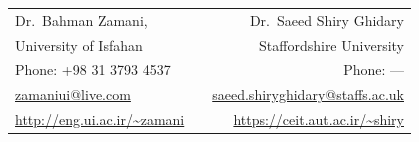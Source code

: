 

\vspace{1mm}


\begin{tabularx}{\textwidth}{l X r}
  Dr.\ Bahman Zamani,
  & \qquad &
  Dr.\ Saeed Shiry Ghidary
  \\
  University of Isfahan
  & \qquad &
  Staffordshire University
  \\
  Phone: +98 31 3793 4537
  & \qquad &
  Phone: —
  \\
  \href{mailto:zamaniui@live.com}{zamaniui@live.com}
  & \qquad &
  \href{mailto:saeed.shiryghidary@staffs.ac.uk}{saeed.shiryghidary@staffs.ac.uk}
  \\
  \url{http://eng.ui.ac.ir/~zamani}
  & \qquad &
  \url{https://ceit.aut.ac.ir/~shiry}
\end{tabularx}

